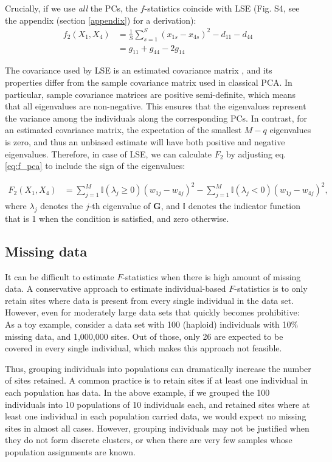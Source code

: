 \documentclass[12pt]{article}
\begin{document}
Crucially, if we use \emph{all} the PCs, the $f$-statistics coincide with LSE (Fig. S4, see the appendix (section \ref{appendix}) for a derivation): 
\begin{align}
    f_2(X_1, X_4) &= \frac{1}{S} \sum_{s=1}^S (x_{1s} - x_{4s})^2 - d_{11} - d_{44} \nonumber\\
    &= g_{11} + g_{44} - 2 g_{14} \label{eq:lse}
\end{align}

The covariance used by LSE is an estimated covariance matrix \citep{van_waaij_evaluation_2023}, and its properties differ from the sample covariance matrix used in classical PCA. In particular, sample covariance matrices are positive semi-definite, which means that all eigenvalues are non-negative. This ensures that the eigenvalues represent the variance among the individuals along the corresponding PCs. In contrast, for an estimated covariance matrix, the expectation of the smallest $M-q$ eigenvalues is zero, and thus an unbiased estimate will have both positive and negative eigenvalues. Therefore, in case of LSE, we can calculate $F_2$ by adjusting eq. \ref{eq:f_pca} to include the sign of the eigenvalues:


\begin{align}\label{eq:f_lse}
F_2(X_1,X_4) &= \sum_{j=1}^{M}\mathbb{I}(\lambda_j \geq 0) (w_{1j} - w_{4j})^2 - \sum_{j=1}^M \mathbb{I}(\lambda_j <0) (w_{1j} - w_{4j})^2,
\end{align}
where $\lambda_j$ denotes the $j$-th eigenvalue of $\mathbf{G}$, and $\mathbb{I}$ denotes the indicator function that is 1 when the condition is satisfied, and zero otherwise.


\subsection{Missing data}
It can be difficult to estimate $F$-statistics when there is high amount of missing data. A conservative approach to estimate individual-based $F$-statistics is to only retain sites where data is present from every single individual in the data set. However, even for moderately large data sets that quickly becomes prohibitive: As a toy example, consider a data set with 100 (haploid) individuals with 10\% missing data, and 1,000,000 sites. Out of those, only 26 are expected to be covered in every single individual, which makes this approach not feasible.

Thus, grouping individuals into populations can dramatically increase the number of sites retained. A common practice is to retain sites if at least one individual in each population has data. In the above example, if we grouped the 100 individuals into 10 populations of 10 individuals each, and retained sites where at least one individual in each population carried data, we would expect no missing sites in almost all cases. However, grouping individuals may not be justified when they do not form discrete clusters, or when there are very few samples whose population assignments are known.
\end{document}
